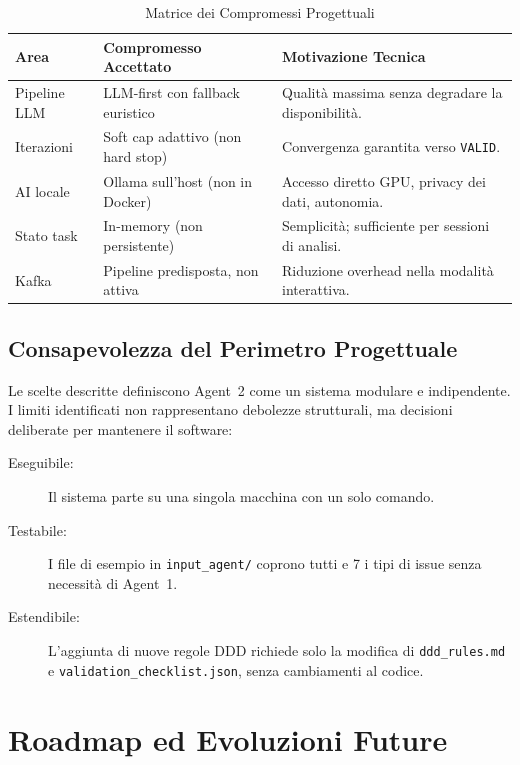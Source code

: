 \documentclass[12pt,a4paper]{report}
\begin{document}
\begin{table}[H]
\centering
\renewcommand{\arraystretch}{1.3}
\begin{tabularx}{\textwidth}{l l X}
\toprule
\textbf{Area} & \textbf{Compromesso Accettato} & \textbf{Motivazione Tecnica} \\
\midrule
Pipeline LLM   & LLM-first con fallback euristico & Qualità massima senza degradare la disponibilità. \\
Iterazioni     & Soft cap adattivo (non hard stop)  & Convergenza garantita verso \texttt{VALID}. \\
AI locale      & Ollama sull'host (non in Docker)   & Accesso diretto GPU, privacy dei dati, autonomia. \\
Stato task     & In-memory (non persistente)        & Semplicità; sufficiente per sessioni di analisi. \\
Kafka          & Pipeline predisposta, non attiva   & Riduzione overhead nella modalità interattiva. \\
\bottomrule
\end{tabularx}
\caption{Matrice dei Compromessi Progettuali}
\label{tab:tradeoffs}
\end{table}

\section{Consapevolezza del Perimetro Progettuale}

Le scelte descritte definiscono Agent~2 come un sistema modulare e indipendente.
I limiti identificati non rappresentano debolezze strutturali, ma decisioni
deliberate per mantenere il software:

\begin{description}
  \item[Eseguibile:] Il sistema parte su una singola macchina con un solo comando.
  \item[Testabile:] I file di esempio in \texttt{input\_agent/} coprono tutti e 7
        i tipi di issue senza necessità di Agent~1.
  \item[Estendibile:] L'aggiunta di nuove regole DDD richiede solo la modifica di
        \texttt{ddd\_rules.md} e \texttt{validation\_checklist.json}, senza
        cambiamenti al codice.
\end{description}

\chapter{Roadmap ed Evoluzioni Future}
\end{document}
